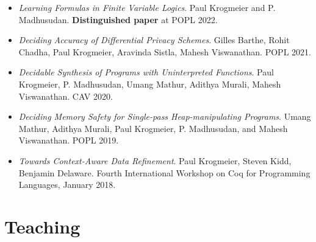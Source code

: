 \documentclass[12pt,a4paper,sans]{moderncv}        %
\newcommand{\MYhref}[3][assassinblue]{\href{#2}{\color{#1}{#3}}}%
\begin{document}
\vspace{4pt}
\begin{itemize}
\item \emph{Learning Formulas in Finite Variable Logics}. Paul
  Krogmeier and P. Madhusudan. \textbf{Distinguished paper} at POPL 2022. \MYhref{https://doi.org/10.1145/3498671}{paper}
  \vspace{10pt}
\item \emph{Deciding Accuracy of Differential Privacy
    Schemes}. Gilles Barthe, Rohit Chadha, Paul Krogmeier, Aravinda
  Sistla, Mahesh Viswanathan. POPL 2021. \MYhref{https://dl.acm.org/doi/abs/10.1145/3434289}{paper}
  \vspace{10pt}
\item \emph{Decidable Synthesis of Programs with Uninterpreted
    Functions}.  Paul Krogmeier, P. Madhusudan, Umang Mathur, Adithya
  Murali, Mahesh Viswanathan. CAV
  2020. \MYhref{https://paper.springer.com/chapter/10.1007/978-3-030-53291-8_32}{paper}
  \vspace{10pt}
\item \emph{Deciding Memory Safety for Single-pass Heap-manipulating
    Programs}. Umang Mathur, Adithya Murali, Paul Krogmeier,
  P. Madhusudan, and Mahesh Viswanathan. POPL 2019.
  \MYhref{https://doi.org/10.1145/3371103}{paper} \vspace{10pt}
\item \emph{Towards Context-Aware Data Refinement}. Paul Krogmeier,
  Steven Kidd, Benjamin Delaware. Fourth International Workshop on Coq
  for Programming Languages, January
  2018. \MYhref{https://popl18.sigplan.org/details/CoqPL-2018/4/Towards-Context-Aware-Data-Refinement}{paper}
\end{itemize}

\section{Teaching}
\label{sec:teaching}
\end{document}
